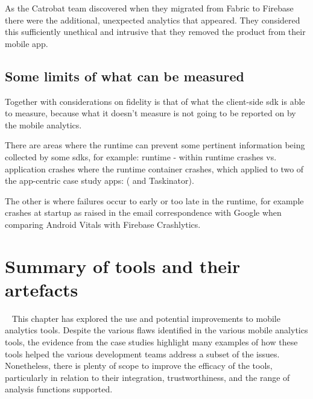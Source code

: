 As the Catrobat team discovered when they migrated from Fabric to Firebase there were the additional, unexpected analytics that appeared. They considered this sufficiently unethical and intrusive that they removed the product from their mobile app.


\subsection{Some limits of what can be measured}
Together with considerations on fidelity is that of what the client-side \Gls{sdk} is able to measure, because what it doesn't measure is not going to be reported on by the mobile analytics. 

There are areas where the runtime can prevent some pertinent information being collected by some \Glspl{sdk}, for example:  runtime - within runtime crashes vs. application crashes where the runtime container crashes, which applied to two of the app-centric case study apps: ( and Taskinator).

The other is where failures occur to early or too late in the runtime, for example crashes at startup as raised in the email correspondence with Google when comparing Android Vitals with Firebase Crashlytics.


\section{Summary of tools and their artefacts}~\label{tata-summary-section}
This chapter has explored the use and potential improvements to mobile analytics tools. Despite the various flaws identified in the various mobile analytics tools, the evidence from the case studies highlight many examples of how these tools helped the various development teams address a subset of the issues. Nonetheless, there is plenty of scope to improve the efficacy of the tools, particularly in relation to their integration, trustworthiness, and the range of analysis functions supported.
